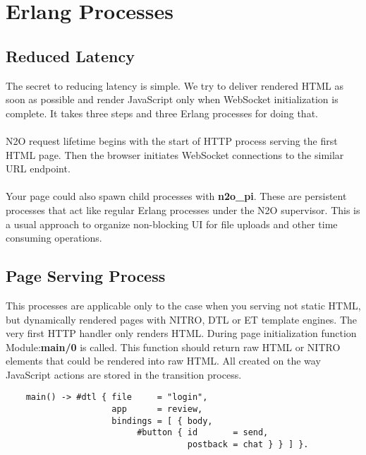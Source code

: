 \section{Erlang Processes}

\subsection{Reduced Latency}
The secret to reducing latency is simple. We try to deliver rendered HTML
as soon as possible and render JavaScript only when WebSocket initialization is complete.
It takes three steps and three Erlang processes for doing that.




\paragraph{}
N2O request lifetime begins with the start of HTTP process serving the first HTML page.
Then the browser initiates WebSocket connections to the similar URL endpoint.

\paragraph{}
Your page could also spawn child processes with {\bf n2o\_pi}.
These are persistent processes that act like regular Erlang processes under the N2O supervisor.
This is a usual approach to organize non-blocking UI for file uploads and other time consuming operations.

\newpage
\subsection{Page Serving Process}
This processes are applicable only to the case when you serving not static HTML,
but dynamically rendered pages with NITRO, DTL or ET template engines.
The very first HTTP handler only renders HTML. During page initialization
function Module:{\bf main/0} is called. This function should return raw HTML or
NITRO elements that could be rendered into raw HTML. All created on the way
JavaScript actions are stored in the transition process.

\vspace{1\baselineskip}
\begin{lstlisting}
    main() -> #dtl { file     = "login",
                     app      = review,
                     bindings = [ { body,
                          #button { id       = send,
                                    postback = chat } } ] }.
\end{lstlisting}
\vspace{1\baselineskip}

